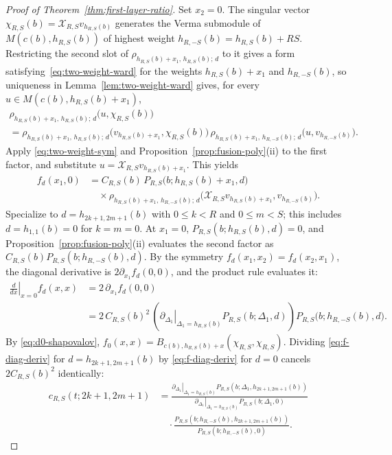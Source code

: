 \documentclass[twoside,10pt]{article}
\numberwithin{equation}{section}
\theoremstyle{slbody}
\theoremstyle{definition}
\theoremstyle{remark}
\begin{document}
\begin{proof}[Proof of Theorem~\ref{thm:first-layer-ratio}]
Set \(x_2=0\).  The singular vector
\(\chi_{R,S}(b)=\mathcal{X}_{R,S}v_{h_{R,S}(b)}\) generates the Verma submodule of
\(M(c(b),h_{R,S}(b))\) of highest weight \(h_{R,-S}(b)=h_{R,S}(b)+RS\).
Restricting the second slot of \(\rho_{h_{R,S}(b)+x_1,\,h_{R,S}(b);\,d}\) to it
gives a form satisfying~\eqref{eq:two-weight-ward} for the weights
\(h_{R,S}(b)+x_1\) and \(h_{R,-S}(b)\), so uniqueness in
Lemma~\ref{lem:two-weight-ward} gives, for every
\(u\in M(c(b),h_{R,S}(b)+x_1)\),
\begin{multline*}
 \rho_{h_{R,S}(b)+x_1,\,h_{R,S}(b);\,d}\bigl(u,\chi_{R,S}(b)\bigr)\\
 =\rho_{h_{R,S}(b)+x_1,\,h_{R,S}(b);\,d}\bigl(v_{h_{R,S}(b)+x_1},\chi_{R,S}(b)\bigr)\,
  \rho_{h_{R,S}(b)+x_1,\,h_{R,-S}(b);\,d}\bigl(u,v_{h_{R,-S}(b)}\bigr).
\end{multline*}
Apply \eqref{eq:two-weight-sym} and Proposition~\ref{prop:fusion-poly}(ii)
to the first factor, and substitute
\(u=\mathcal{X}_{R,S}v_{h_{R,S}(b)+x_1}\).  This yields
\[
 \begin{aligned}
 f_d(x_1,0)
 &=C_{R,S}(b)\,P_{R,S}\bigl(b;h_{R,S}(b)+x_1,d\bigr)\\
 &\quad\times\rho_{h_{R,S}(b)+x_1,\,h_{R,-S}(b);\,d}
  \bigl(\mathcal{X}_{R,S}v_{h_{R,S}(b)+x_1},v_{h_{R,-S}(b)}\bigr).
 \end{aligned}
\]
Specialize to \(d=h_{2k+1,2m+1}(b)\) with \(0\leq k<R\) and
\(0\leq m<S\); this includes \(d=h_{1,1}(b)=0\) for \(k=m=0\).  At
\(x_1=0\), \(P_{R,S}(b;h_{R,S}(b),d)=0\), and
Proposition~\ref{prop:fusion-poly}(ii) evaluates the second factor as
\(C_{R,S}(b)P_{R,S}(b;h_{R,-S}(b),d)\).  By the symmetry
\(f_d(x_1,x_2)=f_d(x_2,x_1)\), the diagonal derivative is
\(2\partial_{x_1}f_d(0,0)\), and the product rule evaluates it:
\begin{equation}\label{eq:f-diag-deriv}
 \begin{aligned}
 \left.\frac{d}{dx}\right|_{x=0}f_d(x,x)
 &=2\,\partial_{x_1}f_d(0,0)\\
 &=2\,C_{R,S}(b)^2\,
  \left(\left.\partial_{\Delta_1}\right|_{\Delta_1=h_{R,S}(b)}
        P_{R,S}(b;\Delta_1,d)\right)
  P_{R,S}\bigl(b;h_{R,-S}(b),d\bigr).
 \end{aligned}
\end{equation}
By \eqref{eq:d0-shapovalov}, \(f_0(x,x)=B_{c(b),h_{R,S}(b)+x}(\chi_{R,S},\chi_{R,S})\).
Dividing \eqref{eq:f-diag-deriv} for \(d=h_{2k+1,2m+1}(b)\) by
\eqref{eq:f-diag-deriv} for \(d=0\) cancels \(2C_{R,S}(b)^2\) identically:
\begin{equation}\label{eq:ratio-from-P}
 \begin{aligned}
 c_{R,S}(t;2k+1,2m+1)
 &=\frac{\left.\partial_{\Delta_1}\right|_{\Delta_1=h_{R,S}(b)}
        P_{R,S}(b;\Delta_1,h_{2k+1,2m+1}(b))}
       {\left.\partial_{\Delta_1}\right|_{\Delta_1=h_{R,S}(b)}
        P_{R,S}(b;\Delta_1,0)}\\
 &\quad\cdot
  \frac{P_{R,S}(b;h_{R,-S}(b),h_{2k+1,2m+1}(b))}
       {P_{R,S}(b;h_{R,-S}(b),0)}.
 \end{aligned}
\end{equation}


\end{proof}
\end{document}
